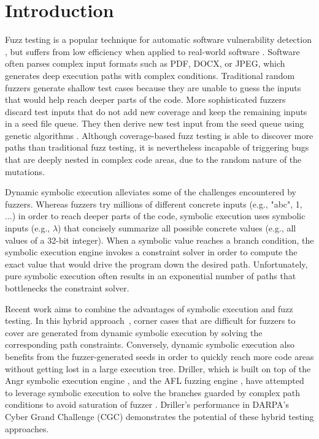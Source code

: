 \documentclass{cta-author}
\begin{document}
\section{Introduction} \label{sec:introduction}
Fuzz testing is a popular technique for automatic software
vulnerability detection \cite{Miller:Fuzz, 5010257, sutton2007fuzzing},
but suffers from low efficiency when applied to real-world software
\cite{neystadt2008automated, godefroid2008automating, ganesh2009taint,
	cadar2011symbolic, rawat2017vuzzer, stephens2016driller}. Software
often parses complex input formats such as PDF, DOCX, or JPEG, which
generates deep execution paths with complex conditions. Traditional
random fuzzers generate shallow test cases because they are unable to
guess the inputs that would help reach deeper parts of the code. More
sophisticated fuzzers discard test inputs that do not add new coverage
and keep the remaining inputs in a seed file queue. They then derive
new test input from the seed queue using genetic algorithms
\cite{rawat2017vuzzer, online:afl, stephens2016driller}. Although
coverage-based fuzz testing is able to discover more paths than
traditional fuzz testing, it is nevertheless incapable of triggering
bugs that are deeply nested in complex code areas, due to the random
nature of the mutations.

Dynamic symbolic execution alleviates some of the challenges
encountered by fuzzers. Whereas fuzzers try millions of different
concrete inputs (e.g., "abc", 1, ...) in order to reach deeper parts of
the code, symbolic execution uses symbolic inputs (e.g., $\lambda$)
that concisely summarize all possible concrete values (e.g., all values
of a 32-bit integer). When a symbolic value reaches a branch condition,
the symbolic execution engine invokes a constraint solver in order to
compute the exact value that would drive the program down the desired
path. Unfortunately, pure symbolic execution often results in an
exponential number of paths that bottlenecks the constraint solver.

Recent work aims to combine the advantages of symbolic execution and
fuzz testing. In this hybrid approach~\cite{godefroid2012sage,
	yeh2015craxfuzz, majumdar2007hybrid, pak2012hybrid}, corner cases that
are difficult for fuzzers to cover are generated from dynamic symbolic
execution by solving the corresponding path constraints. Conversely,
dynamic symbolic execution also benefits from the fuzzer-generated
seeds in order to quickly reach more code areas without getting lost in
a large execution tree. Driller, which is built on top of the Angr
symbolic execution engine \cite{Shoshitaishvili_firmalice-automatic},
and the AFL fuzzing engine \cite{online:afl}, have attempted to
leverage symbolic execution to solve the branches guarded by complex
path conditions to avoid saturation of fuzzer
\cite{stephens2016driller}. Driller's performance in DARPA's Cyber
Grand Challenge (CGC) \cite{online:CGC} demonstrates the potential of
these hybrid testing approaches.
\end{document}
